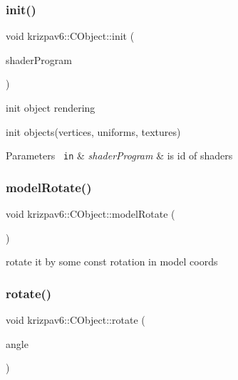 \subsubsection{\texorpdfstring{init()}{init()}}
{\footnotesize\ttfamily void krizpav6\+::\+C\+Object\+::init (\begin{DoxyParamCaption}\item[{G\+Luint}]{shader\+Program }\end{DoxyParamCaption})}



init object rendering 

init objects(vertices, uniforms, textures) 
\begin{DoxyParams}[1]{Parameters}
\mbox{\texttt{ in}}  & {\em shader\+Program} & is id of shaders \\
\hline
\end{DoxyParams}
\mbox{\label{classkrizpav6_1_1_c_object_a379afd3ab5d07d506038390d50f526a2}} 
\subsubsection{\texorpdfstring{modelRotate()}{modelRotate()}}
{\footnotesize\ttfamily void krizpav6\+::\+C\+Object\+::model\+Rotate (\begin{DoxyParamCaption}{ }\end{DoxyParamCaption})}



rotate it by some const rotation in model coords 

\mbox{\label{classkrizpav6_1_1_c_object_a5ba3a425e887270b8ae5febac7d18c18}} 
\subsubsection{\texorpdfstring{rotate()}{rotate()}}
{\footnotesize\ttfamily void krizpav6\+::\+C\+Object\+::rotate (\begin{DoxyParamCaption}\item[{float}]{angle }\end{DoxyParamCaption})}



